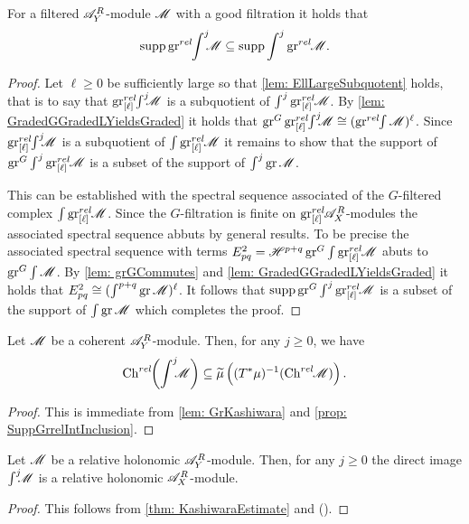 \begin{proposition}\label{prop: SuppGrrelIntInclusion}
  For a filtered $\A_Y^R$-module $\M$ with a good filtration it holds that  $$\supp \grrel\IntJ{j}\M \subseteq \supp \int^j \grrel\M.$$
\end{proposition}
\begin{proof}
  Let $\ell\geq 0$ be sufficiently large so that \cref{lem: EllLargeSubquotent} holds, that is to say that $\grl\IntJ{j} \M$ is a subquotient of $\int^j \grl \M$.
  By \cref{lem: GradedGGradedLYieldsGraded} it holds that $\gr^G\grl \IntJ{j} \M \cong (\grrel\int\M)^\ell$.
  Since $\grl \IntJ{j} \M$ is a subquotient of $\int \grl\M$ it remains to show that the support of $\gr^G \int^j \grl\M$ is a subset of the support of $\int^j \gr \M$.

  This can be established with the spectral sequence associated of the $G$-filtered complex $\int \grl \M$. Since the $G$-filtration is finite on $\grl\A_X^R$-modules the associated spectral sequence abbuts by general results. To be precise the associated spectral sequence with terms
  $E^2_{pq} = \H^{p+q}\gr^G \int \grl \M$ abuts to $\gr^G\int \M$.
  By \cref{lem: grGCommutes} and \cref{lem: GradedGGradedLYieldsGraded} it holds that $E^2_{pq} \cong (\int^{p+q}\gr \M)^\ell$. 
  It follows that $\supp\gr^G \int^j \grl\M$ is a subset of the support of $\int \gr \M$ which completes the proof.
\end{proof}
\begin{theorem}\label{thm: KashiwaraEstimate}
    Let $\M$ be a coherent $\A_Y^R$-module. Then, for any $j\geq 0$, we have
    $$\Chrel\left(\IntJ{j} \M \right)\subseteq  \widetilde{\mu}\left((T^*\mu)^{-1}(\Chrel \M) \right).$$
\end{theorem}
\begin{proof}
  This is immediate from \cref{lem: GrKashiwara} and \cref{prop: SuppGrrelIntInclusion}.
\end{proof}
\begin{corollary}\label{cor: RelHolConserved}
  Let $\M$ be a relative holonomic $\A_Y^R$-module. Then, for any $j\geq 0$ the direct image $\IntJ{j}\M$ is a relative holonomic $\A_X^R$-module.
\end{corollary}
\begin{proof}
  This follows from \cref{thm: KashiwaraEstimate} and ().
\end{proof}
